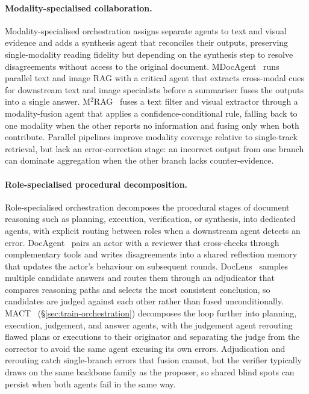 \documentclass[11pt]{article}
\begin{document}
\paragraph{Modality-specialised collaboration.} Modality-specialised orchestration assigns separate agents to text and visual evidence and adds a synthesis agent that reconciles their outputs, preserving single-modality reading fidelity but depending on the synthesis step to resolve disagreements without access to the original document. MDocAgent~\cite{han2025mdocagent} runs parallel text and image RAG with a critical agent that extracts cross-modal cues for downstream text and image specialists before a summariser fuses the outputs into a single answer. M$^2$RAG~\cite{duan2025m2rag} fuses a text filter and visual extractor through a modality-fusion agent that applies a confidence-conditional rule, falling back to one modality when the other reports no information and fusing only when both contribute. Parallel pipelines improve modality coverage relative to single-track retrieval, but lack an error-correction stage: an incorrect output from one branch can dominate aggregation when the other branch lacks counter-evidence.

\paragraph{Role-specialised procedural decomposition.} Role-specialised orchestration decomposes the procedural stages of document reasoning such as planning, execution, verification, or synthesis, into dedicated agents, with explicit routing between roles when a downstream agent detects an error. DocAgent~\cite{sun2025docagent} pairs an actor with a reviewer that cross-checks through complementary tools and writes disagreements into a shared reflection memory that updates the actor's behaviour on subsequent rounds. DocLens~\cite{zhu2025doclens} samples multiple candidate answers and routes them through an adjudicator that compares reasoning paths and selects the most consistent conclusion, so candidates are judged against each other rather than fused unconditionally. MACT~\cite{yu2025mact} (\S\ref{sec:train-orchestration}) decomposes the loop further into planning, execution, judgement, and answer agents, with the judgement agent rerouting flawed plans or executions to their originator and separating the judge from the corrector to avoid the same agent excusing its own errors. Adjudication and rerouting catch single-branch errors that fusion cannot, but the verifier typically draws on the same backbone family as the proposer, so shared blind spots can persist when both agents fail in the same way.
\end{document}
